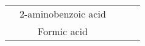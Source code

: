 \begin{table}[H]
\begin{tabular}{@{}lcccl@{}}
                                                      & \cellcolor[HTML]{FFF}2-aminobenzoic acid                 &                                                                                               &                                                    &                                                                                                                                                                                                                                                                                                                                                                                                                                                                                                                                                                                                                                                                                                                                                                                                                                                                                                                                                     \\
                                                      & \cellcolor[HTML]{FFF}Formic acid                         &                                                                                               &                                                    &                                                                                                                                                                                                                                                                                                                                                                                                                                                                                                                                                                                                                                                                                                                                                                                                                                                                                                                                                     \\

\end{tabular}
\end{table}
